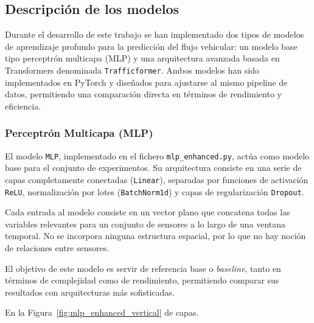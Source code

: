 \subsection{Descripción de los modelos}
\label{sec:descripcion_modelos}

Durante el desarrollo de este trabajo se han implementado dos tipos de modelos de aprendizaje profundo para la predicción del flujo vehicular: un modelo base tipo perceptrón multicapa (MLP) y una arquitectura avanzada basada en Transformers denominada \texttt{Trafficformer}. Ambos modelos han sido implementados en PyTorch y diseñados para ajustarse al mismo pipeline de datos, permitiendo una comparación directa en términos de rendimiento y eficiencia.

\subsubsection*{Perceptrón Multicapa (MLP)}

El modelo \texttt{MLP}, implementado en el fichero \texttt{mlp\_enhanced.py}, actúa como modelo base para el conjunto de experimentos. Su arquitectura consiste en una serie de capas completamente conectadas (\texttt{Linear}), separadas por funciones de activación \texttt{ReLU}, normalización por lotes (\texttt{BatchNorm1d}) y capas de regularización \texttt{Dropout}.

Cada entrada al modelo consiste en un vector plano que concatena todas las variables relevantes para un conjunto de sensores a lo largo de una ventana temporal. No se incorpora ninguna estructura espacial, por lo que no hay noción de relaciones entre sensores.

El objetivo de este modelo es servir de referencia base o \textit{baseline}, tanto en términos de complejidad como de rendimiento, permitiendo comparar sus resultados con arquitecturas más sofisticadas.

En la Figura~\ref{fig:mlp_enhanced_vertical} 
 de capas.

